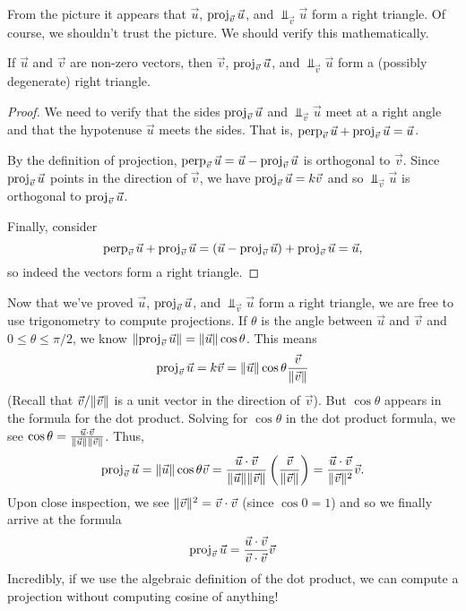 From the picture it appears that $\vec u$, $\operatorname{proj}_{\vec v}\vec u$,
and $\Perp_{\vec v}\vec u$ form a right triangle.  Of course, we shouldn't
trust the picture. We should verify this mathematically.

\begin{theorem}
	If $\vec u$ and $\vec v$ are non-zero vectors, then $\vec v$, $\operatorname{proj}_{\vec v}\vec u$,
	and $\Perp_{\vec v}\vec u$ form a (possibly degenerate) right triangle.
\end{theorem}
\begin{proof}
	We need to verify that the sides $\operatorname{proj}_{\vec v}\vec u$ and $\Perp_{\vec v}\vec u$
	meet at a right angle and that the hypotenuse $\vec u$ meets the sides.  That is,
	$\operatorname{perp}_{\vec v}\vec u+\operatorname{proj}_{\vec v}\vec u=\vec u$.

	By the definition of projection, $\operatorname{perp}_{\vec v}\vec u=\vec u-\operatorname{proj}_{\vec v}\vec u$
	is orthogonal to $\vec v$.  Since $\operatorname{proj}_{\vec v}\vec u$ points in the
	direction of $\vec v$, we have $\operatorname{proj}_{\vec v}\vec u=k\vec v$ and so
	$\Perp_{\vec v}\vec u$ is orthogonal to $\operatorname{proj}_{\vec v}\vec u$.

	Finally, consider
	\[
		\operatorname{perp}_{\vec v}\vec u+\operatorname{proj}_{\vec v}\vec u=
		(\vec u-\operatorname{proj}_{\vec v}\vec u)+\operatorname{proj}_{\vec v}\vec u=\vec u,
	\]
	so indeed the vectors form a right triangle.
\end{proof}

Now that we've proved $\vec u$, $\operatorname{proj}_{\vec v}\vec u$,
and $\Perp_{\vec v}\vec u$ form a right triangle, we are free to use
trigonometry to compute projections.  If $\theta$ is the angle between $\vec u$
and $\vec v$ and $0\leq \theta\leq \pi/2$, 
we know $\lVert\operatorname{proj}_{\vec v}\vec u\rVert=\lVert\vec u\rVert\cos\theta$.  This means
\[
	\operatorname{proj}_{\vec v}\vec u = k\vec v=\lVert\vec u\rVert\cos\theta\frac{\vec v}{\lVert\vec v\rVert}
\]
(Recall that $\vec v/\lVert\vec v\rVert$ is a unit vector in the direction of $\vec v$).
But $\cos \theta$ appears in the formula for the dot product.  Solving for
$\cos\theta$ in the dot product formula, we see $\cos\theta=\frac{\vec u\cdot\vec v}{\lVert\vec u\rVert\lVert\vec v\rVert}$.
Thus,
\[
	\operatorname{proj}_{\vec v}\vec u = \lVert\vec u\rVert\cos\theta\vec v
	=\frac{\vec u\cdot \vec v}{\lVert\vec u\rVert\lVert\vec v\rVert}\left(\frac{\vec v}{\lVert\vec v\rVert}\right)
	=\frac{\vec u\cdot \vec v}{\lVert\vec v\rVert^2}\vec v.
\]
Upon close inspection, we see $\lVert\vec v\rVert^2=\vec v\cdot \vec v$ (since $\cos 0=1$)
and so we finally arrive at the formula
\[
	\operatorname{proj}_{\vec v}\vec u  
	=\frac{\vec u\cdot \vec v}{\vec v\cdot \vec v}\vec v
\]
Incredibly, if we use the algebraic definition of the dot product, we can
compute a projection without computing cosine of anything!

